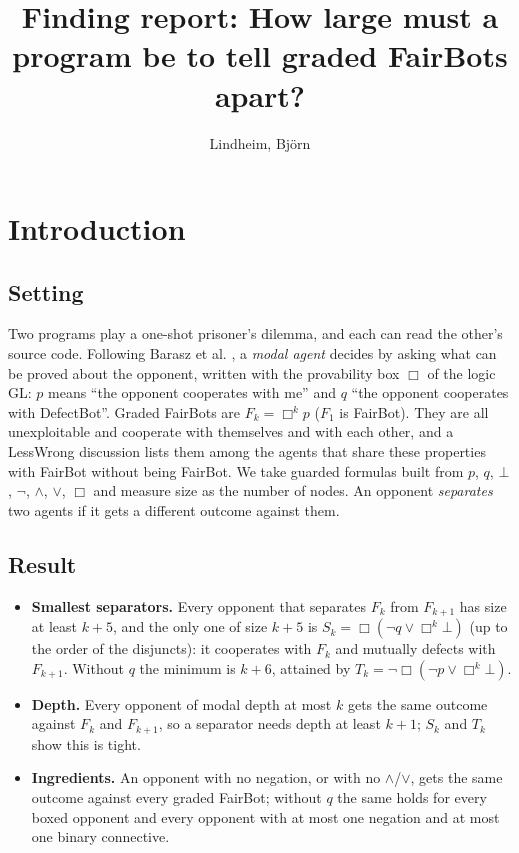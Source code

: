 \documentclass{article}
\title{Finding report: How large must a program be to tell graded FairBots apart?}
\author{Lindheim, Björn}
\date{}
\begin{document}
\maketitle
\section{Introduction}
\label{sec:graded-fairbot-separators}

\subsection*{Setting}

Two programs play a one-shot prisoner's dilemma, and each can read the other's source code.
Following Barasz et al. \cite{barasz2014robust}, a \emph{modal agent} decides by asking what can be proved
about the opponent, written with the provability box $\Box$ of the logic GL: $p$ means ``the
opponent cooperates with me'' and $q$ ``the opponent cooperates with DefectBot''. Graded FairBots
are $F_k = \Box^k p$ ($F_1$ is FairBot). They are all unexploitable and cooperate with themselves
and with each other, and a LessWrong discussion \cite{onlyonefairbot2026} lists them among the agents
that share these properties with FairBot without being FairBot. We take guarded formulas built
from $p$, $q$, $\bot$, $\neg$, $\wedge$, $\vee$, $\Box$ and measure size as the number of nodes. An
opponent \emph{separates} two agents if it gets a different outcome against them.

\subsection*{Result}

\begin{itemize}
\item \textbf{Smallest separators.} Every opponent that separates $F_k$ from $F_{k+1}$ has size at least $k+5$, and the only one of size $k+5$ is $S_k = \Box(\neg q \vee \Box^k\bot)$ (up to the order of the disjuncts): it cooperates with $F_k$ and mutually defects with $F_{k+1}$. Without $q$ the minimum is $k+6$, attained by $T_k = \neg\Box(\neg p \vee \Box^k\bot)$.
\item \textbf{Depth.} Every opponent of modal depth at most $k$ gets the same outcome against $F_k$ and $F_{k+1}$, so a separator needs depth at least $k+1$; $S_k$ and $T_k$ show this is tight.
\item \textbf{Ingredients.} An opponent with no negation, or with no $\wedge$/$\vee$, gets the same outcome against every graded FairBot; without $q$ the same holds for every boxed opponent and every opponent with at most one negation and at most one binary connective.
\end{itemize}
\end{document}

